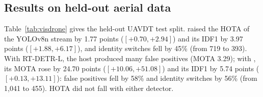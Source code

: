 

\subsection{Results on held-out aerial data}\label{sec:visdrone}
Table~\ref{tab:visdrone} gives the held-out UAVDT test split. \scl{} raised the HOTA of the YOLOv8n stream by 1.77 points
($[+0.70,+2.94]$) and its IDF1 by 3.97 points ($[+1.88,+6.17]$), and
identity switches fell by 45\% (from 719 to 393). With RT-DETR-L, the host produced many false
positives (MOTA 3.29); with \scl{}, its MOTA rose by 24.70 points
($[+10.06,+51.08]$) and its IDF1 by 5.74 points ($[+0.13,+13.11]$): false
positives fell by 58\% and identity switches by 56\% (from 1,041 to 455). HOTA did not fall with either
detector.


